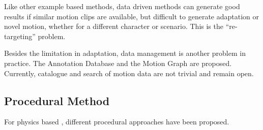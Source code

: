Like other example based methods, data driven methods can generate good results if similar motion clips are available, but difficult to generate  adaptation or novel motion, whether for a different character or scenario. 
This is the  ``re-targeting'' problem.

Besides the limitation in adaptation,  data management is another problem in practice. 
The Annotation Database \citep{Arikan2003} and the Motion Graph \citep{kovar2008motion} are proposed. 
Currently, catalogue and search of motion data are not trivial and remain open\citep{keogh2004indexing,muller2005efficient}.

\subsection{Procedural Method}
For physics based \cms, different procedural approaches have been proposed.
